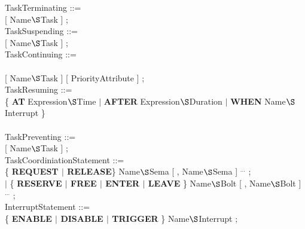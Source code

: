 TaskTerminating ::=\\
 [ Name$\S $Task ] ; \\

TaskSuspending ::=\\
 [ Name$\S $Task ] ;\\

TaskContinuing ::=\\
\\
 [ Name$\S $Task ] [ PriorityAttribute ] ;\\

TaskResuming ::=\\
\x \{ {\bf AT} Expression$\S $Time $\mid$ {\bf AFTER} Expression$\S $Duration $\mid$ {\bf WHEN} Name$\S $Interrupt \}\\
\\        

TaskPreventing ::=\\
 [ Name$\S $Task ] ;\\

TaskCoordiniationStatement ::=\\
\x \{ {\bf REQUEST $\mid$ RELEASE}\} Name$\S $Sema [ , Name$\S $Sema ] $^{...}$ ;\\
\x $\mid$ \{ {\bf RESERVE $\mid$ FREE $\mid$ ENTER $\mid$ LEAVE} \} Name$\S $Bolt [ , Name$\S $Bolt ] $^{...}$ ;\\


InterruptStatement ::=\\
\x \{ {\bf ENABLE $\mid$ DISABLE $\mid$ TRIGGER} \} Name$\S $Interrupt ;\\

